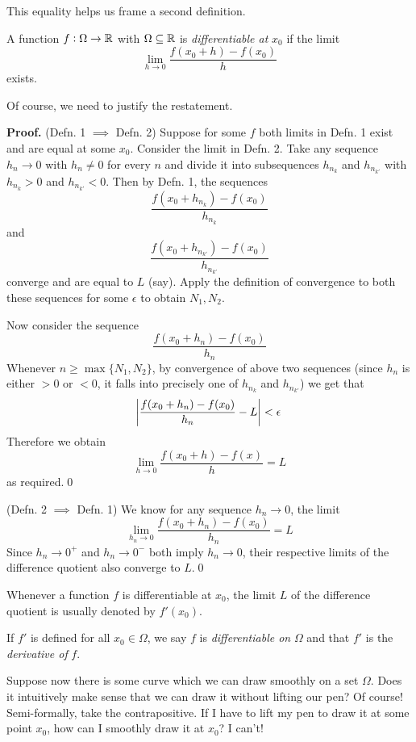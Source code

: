 This equality helps us frame a second definition.
\begin{SNP}{\dfn}{A function $f: \Omega \rightarrow \mathbb{R}$ with $\Omega \subseteq \mathbb{R}$ is \emph{differentiable at} $x_0$ if the limit
$$
\lim_{h\rightarrow0} \frac{f(x_0 + h) - f(x_0)}{h}
$$exists.}
\end{SNP}

Of course, we need to justify the restatement.

\begin{smrg}
\textbf{Proof.} (Defn. 1 $\implies$ Defn. 2) Suppose for some $f$ both limits in Defn. 1 exist and are equal at some $x_0$. Consider the limit in Defn. 2. Take any sequence $h_n \rightarrow 0$ with $h_n \neq 0$ for every $n$ and divide it into subsequences $h_{n_k}$ and $h_{n_{k'}}$ with $h_{n_k} > 0$ and $h_{n_{k'}} < 0$. Then by Defn. 1, the sequences 
$$
\frac{f(x_0 + h_{n_k}) - f(x_0)}{h_{n_k}}
$$
and
$$
\frac{f(x_0 + h_{n_{k'}}) - f(x_0)}{h_{n_{k'}}}
$$
converge and are equal to $L$ (say). Apply the definition of convergence to both these sequences for some $\epsilon$ to obtain $N_1, N_2$.

Now consider the sequence
$$
\frac{f(x_0 + h_n) - f(x_0)}{h_n}
$$
Whenever $n \geq \max\{N_1, N_2\}$, by convergence of above two sequences (since $h_n$ is either $>0$ or $<0$, it falls into precisely one of $h_{n_k}$ and $h_{n_{k'}}$) we get that
$$
\abs{\frac{f(x_0 + h_n) - f(x_0)}{h_n} - L} < \epsilon
$$
Therefore we obtain
$$
\lim_{h\rightarrow 0}\frac{f(x_0 + h) - f(x)}{h} = L
$$
as required.\qed

(Defn. 2 $\implies$ Defn. 1) We know for any sequence $h_n \rightarrow 0$, the limit
$$
\lim_{h_n\rightarrow 0}\frac{f(x_0 + h_n) - f(x_0)}{h_n} = L
$$
Since $h_n \rightarrow 0^+$ and $h_n \rightarrow 0^-$ both imply $h_n \rightarrow 0$, their respective limits of the difference quotient also converge to $L$.\qed
\end{smrg}
Whenever a function $f$ is differentiable at $x_0$, the limit $L$ of the difference quotient is usually denoted by $f'(x_0)$.

If $f'$ is defined for all $x_0 \in \Omega$, we say $f$ is \emph{differentiable on} $\Omega$ and that $f'$ is the \emph{derivative of} $f$.

Suppose now there is some curve which we can draw smoothly on a set $\Omega$. Does it intuitively make sense that we can draw it without lifting our pen? Of course! Semi-formally, take the contrapositive. If I have to lift my pen to draw it at some point $x_0$, how can I smoothly draw it at $x_0$? I can't!

